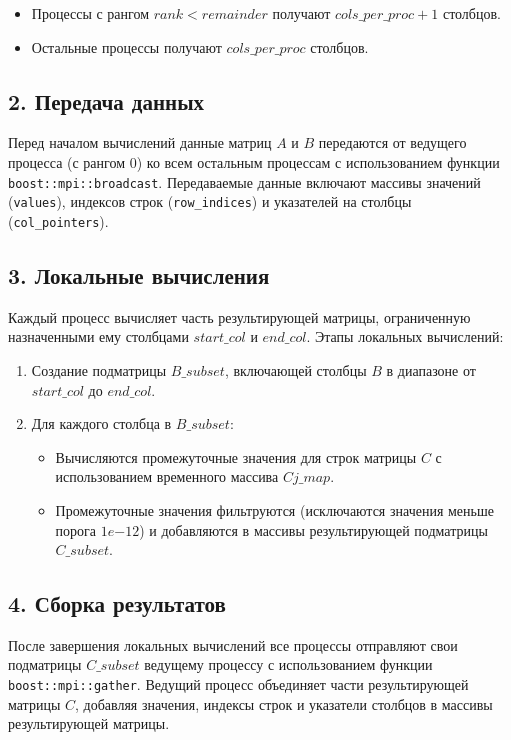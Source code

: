 \documentclass[12pt]{article}
\begin{document}
\begin{itemize}
    \item Процессы с рангом \( rank < remainder \) получают \( cols\_per\_proc + 1 \) столбцов.
    \item Остальные процессы получают \( cols\_per\_proc \) столбцов.
\end{itemize}

\subsection*{2. Передача данных}
Перед началом вычислений данные матриц \( A \) и \( B \) передаются от ведущего процесса (с рангом 0) ко всем остальным процессам с использованием функции \texttt{boost::mpi::broadcast}. Передаваемые данные включают массивы значений (\texttt{values}), индексов строк (\texttt{row\_indices}) и указателей на столбцы (\texttt{col\_pointers}).

\subsection*{3. Локальные вычисления}
Каждый процесс вычисляет часть результирующей матрицы, ограниченную назначенными ему столбцами \( start\_col \) и \( end\_col \). Этапы локальных вычислений:
\begin{enumerate}
    \item Создание подматрицы \( B\_subset \), включающей столбцы \( B \) в диапазоне от \( start\_col \) до \( end\_col \).
    \item Для каждого столбца в \( B\_subset \):
    \begin{itemize}
        \item Вычисляются промежуточные значения для строк матрицы \( C \) с использованием временного массива \( Cj\_map \).
        \item Промежуточные значения фильтруются (исключаются значения меньше порога \( 1e{-12} \)) и добавляются в массивы результирующей подматрицы \( C\_subset \).
    \end{itemize}
\end{enumerate}

\subsection*{4. Сборка результатов}
После завершения локальных вычислений все процессы отправляют свои подматрицы \( C\_subset \) ведущему процессу с использованием функции \texttt{boost::mpi::gather}. Ведущий процесс объединяет части результирующей матрицы \( C \), добавляя значения, индексы строк и указатели столбцов в массивы результирующей матрицы.
\end{document}
